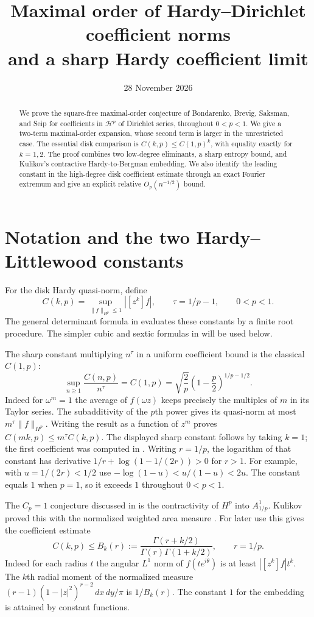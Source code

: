 \documentclass[11pt]{article}
\title{Maximal order of Hardy--Dirichlet coefficient norms\\and a sharp Hardy coefficient limit}
\author{}
\date{28 November 2026}
\begin{document}
\maketitle
\begin{abstract}
We prove the square-free maximal-order conjecture of
Bondarenko, Brevig, Saksman, and Seip for coefficients in
\(\mathcal H^p\) of Dirichlet series, throughout \(0<p<1\).
We give a two-term maximal-order expansion, whose second term
is larger in the unrestricted case. The essential disk comparison is
\(C(k,p)\le C(1,p)^k\), with equality exactly for \(k=1,2\).
The proof combines two low-degree eliminants, a sharp entropy
bound, and Kulikov's contractive Hardy-to-Bergman embedding.
We also identify the leading constant in the high-degree
disk coefficient estimate through an exact Fourier extremum
and give an explicit relative \(O_p(n^{-1/2})\) bound.
\end{abstract}

\section{Notation and the two Hardy--Littlewood constants}

For the disk Hardy quasi-norm, define
\[
 C(k,p)=\sup_{\|f\|_{H^p}\le1}|[z^k]f|,
 \qquad \tau=1/p-1,\qquad 0<p<1 .
\]
The general determinant formula in \cite{General} evaluates these
constants by a finite root procedure. The simpler cubic and
sextic formulas in \cite{Low} will be used below.

The sharp constant multiplying \(n^\tau\) in a uniform
coefficient bound is the classical \(C(1,p)\):
\[
 \sup_{n\ge1}\frac{C(n,p)}{n^\tau}
   =C(1,p)=\sqrt{\frac2p}\left(1-\frac p2\right)^{1/p-1/2}.
\]
Indeed for \(\omega^m=1\) the average of \(f(\omega z)\)
keeps precisely the multiples of \(m\) in its Taylor series.
The subadditivity of the \(p\)th power gives its quasi-norm at
most \(m^\tau\|f\|_{H^p}\). Writing the result as a function
of \(z^m\) proves \(C(mk,p)\le m^\tau C(k,p)\).
The displayed sharp constant follows by taking \(k=1\);
the first coefficient was computed in \cite{BBSS,BrevigSaksman}.
Writing \(r=1/p\), the logarithm of that constant has derivative
\(1/r+\log(1-1/(2r))>0\) for \(r>1\).
For example, with \(u=1/(2r)<1/2\) use
\(-\log(1-u)<u/(1-u)<2u\).
The constant equals \(1\) when \(p=1\), so it exceeds
\(1\) throughout \(0<p<1\).

The \(C_p=1\) conjecture discussed in \cite[Section~5]{BrevigSaksman}
is the contractivity of \(H^p\) into \(A^1_{1/p}\).
Kulikov proved this with the normalized weighted area measure
\cite[Corollary~1.3]{Kulikov}. For later use this gives the
coefficient estimate
\begin{equation}\label{eq:gamma-bound}
 C(k,p)\le B_k(r)
 :=\frac{\Gamma(r+k/2)}{\Gamma(r)\Gamma(1+k/2)},
 \qquad r=1/p .
\end{equation}
Indeed for each radius \(t\) the angular \(L^1\) norm of
\(f(te^{i\theta})\) is at least \(|[z^k]f|t^k\).
The \(k\)th radial moment of the normalized measure
\((r-1)(1-|z|^2)^{r-2}\,dx\,dy/\pi\) is \(1/B_k(r)\).
The constant \(1\) for the embedding is attained by constant
functions.
\end{document}
